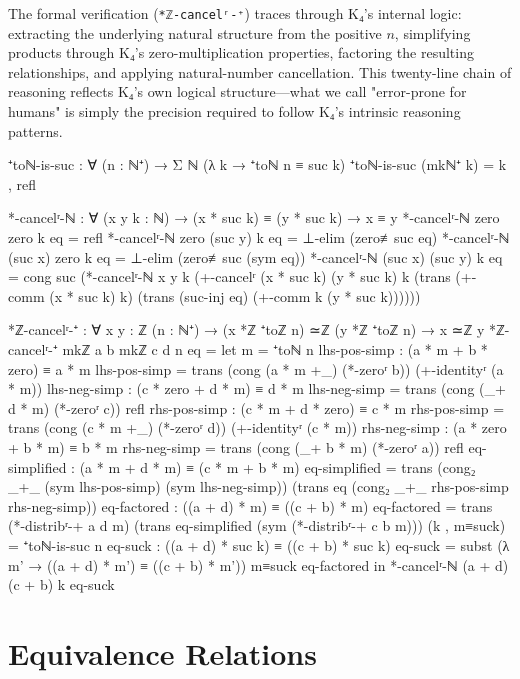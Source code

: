 \documentclass[11pt,a4paper]{book}
\begin{document}
The formal verification (\texttt{*ℤ-cancelʳ-⁺}) traces through K₄'s internal logic: extracting the underlying natural structure from the positive $n$, simplifying products through K₄'s zero-multiplication properties, factoring the resulting relationships, and applying natural-number cancellation. This twenty-line chain of reasoning reflects K₄'s own logical structure—what we call "error-prone for humans" is simply the precision required to follow K₄'s intrinsic reasoning patterns.

\begin{code}
⁺toℕ-is-suc : ∀ (n : ℕ⁺) → Σ ℕ (λ k → ⁺toℕ n ≡ suc k)
⁺toℕ-is-suc (mkℕ⁺ k) = k , refl

*-cancelʳ-ℕ : ∀ (x y k : ℕ) → (x * suc k) ≡ (y * suc k) → x ≡ y
*-cancelʳ-ℕ zero zero k eq = refl
*-cancelʳ-ℕ zero (suc y) k eq = ⊥-elim (zero≢suc eq)
*-cancelʳ-ℕ (suc x) zero k eq = ⊥-elim (zero≢suc (sym eq))
*-cancelʳ-ℕ (suc x) (suc y) k eq = 
  cong suc (*-cancelʳ-ℕ x y k (+-cancelʳ (x * suc k) (y * suc k) k 
    (trans (+-comm (x * suc k) k) (trans (suc-inj eq) (+-comm k (y * suc k))))))

*ℤ-cancelʳ-⁺ : ∀ {x y : ℤ} (n : ℕ⁺) → (x *ℤ ⁺toℤ n) ≃ℤ (y *ℤ ⁺toℤ n) → x ≃ℤ y
*ℤ-cancelʳ-⁺ {mkℤ a b} {mkℤ c d} n eq = 
  let m = ⁺toℕ n
      lhs-pos-simp : (a * m + b * zero) ≡ a * m
      lhs-pos-simp = trans (cong (a * m +_) (*-zeroʳ b)) (+-identityʳ (a * m))
      lhs-neg-simp : (c * zero + d * m) ≡ d * m
      lhs-neg-simp = trans (cong (_+ d * m) (*-zeroʳ c)) refl
      rhs-pos-simp : (c * m + d * zero) ≡ c * m
      rhs-pos-simp = trans (cong (c * m +_) (*-zeroʳ d)) (+-identityʳ (c * m))
      rhs-neg-simp : (a * zero + b * m) ≡ b * m
      rhs-neg-simp = trans (cong (_+ b * m) (*-zeroʳ a)) refl
      eq-simplified : (a * m + d * m) ≡ (c * m + b * m)
      eq-simplified = trans (cong₂ _+_ (sym lhs-pos-simp) (sym lhs-neg-simp))
                      (trans eq (cong₂ _+_ rhs-pos-simp rhs-neg-simp))
      eq-factored : ((a + d) * m) ≡ ((c + b) * m)
      eq-factored = trans (*-distribʳ-+ a d m) 
                    (trans eq-simplified (sym (*-distribʳ-+ c b m)))
      (k , m≡suck) = ⁺toℕ-is-suc n
      eq-suck : ((a + d) * suc k) ≡ ((c + b) * suc k)
      eq-suck = subst (λ m' → ((a + d) * m') ≡ ((c + b) * m')) m≡suck eq-factored
  in *-cancelʳ-ℕ (a + d) (c + b) k eq-suck
\end{code}

\section{Equivalence Relations}
\end{document}
